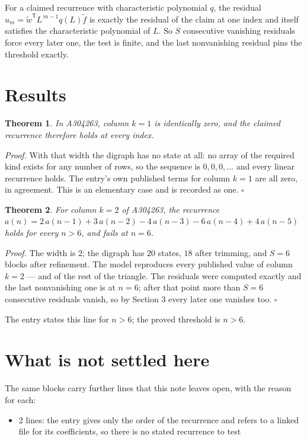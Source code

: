 \documentclass[11pt]{article}
\newtheorem{theorem}{Theorem}
\theoremstyle{definition}
\begin{document}
For a claimed recurrence with characteristic polynomial $q$, the residual $u_m = \tilde w^{\mathsf T}L^{\,m-1}q(L)\tilde f$ is exactly the residual of the claim at one index and itself satisfies the characteristic polynomial of $L$. So $S$ consecutive vanishing residuals force every later one, the test is finite, and the last nonvanishing residual pins the threshold exactly.

\section{Results}

\begin{theorem} In A304263, column $k = 1$ is identically zero, and the claimed recurrence therefore holds at every index.\end{theorem}

{\itshape Proof.} With that width the digraph has no state at all: no array of the required kind exists for any number of rows, so the sequence is $0,0,0,\dots$ and every linear recurrence holds. The entry's own published terms for column $k = 1$ are all zero, in agreement. This is an elementary case and is recorded as one. $\square$

\begin{theorem} For column $k = 2$ of A304263, the recurrence $a(n) = 2\,a(n-1) + 3\,a(n-2) - 4\,a(n-3) - 6\,a(n-4) + 4\,a(n-5)$ holds for every $n > 6$, and fails at $n = 6$.\end{theorem}

{\itshape Proof.} The width is $2$; the digraph has $20$ states, $18$ after trimming, and $S = 6$ blocks after refinement. The model reproduces every published value of column $k = 2$ --- and of the rest of the triangle. The residuals were computed exactly and the last nonvanishing one is at $n = 6$; after that point more than $S = 6$ consecutive residuals vanish, so by Section 3 every later one vanishes too. $\square$

The entry states this line for $n > 6$; the proved threshold is $n > 6$.

\section{What is not settled here}

The same blocks carry further lines that this note leaves open, with the reason for each:

\begin{itemize}

\item 2 lines: the entry gives only the order of the recurrence and refers to a linked file for its coefficients, so there is no stated recurrence to test

\end{itemize}
\end{document}
